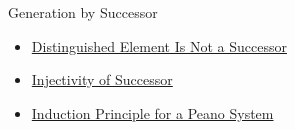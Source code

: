 \begin{topicbox}{Generation by Successor}
\begin{remark*}[Dependencies]
\begin{itemize}
  \item \hyperref[ax:peano-one-not-successor]{Distinguished Element Is Not a Successor}
  \item \hyperref[ax:peano-successor-injective]{Injectivity of Successor}
  \item \hyperref[thm:induction-principle-for-peano-system]{Induction Principle for a Peano System}
\end{itemize}
\end{remark*}
\end{topicbox}
